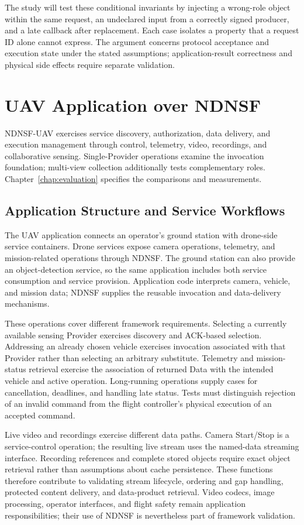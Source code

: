 The study will test these conditional invariants by injecting a wrong-role object within the same request, an undeclared input from a correctly signed producer, and a late callback after replacement. Each case isolates a property that a request ID alone cannot express. The argument concerns protocol acceptance and execution state under the stated assumptions; application-result correctness and physical side effects require separate validation.

\chapter{UAV Application over NDNSF}
\label{chap:uav}
\label{chap:applications}
NDNSF-UAV exercises service discovery, authorization, data delivery, and execution management through control, telemetry, video, recordings, and collaborative sensing. Single-Provider operations examine the invocation foundation; multi-view collection additionally tests complementary roles. Chapter~\ref{chap:evaluation} specifies the comparisons and measurements.

\section{Application Structure and Service Workflows}
The UAV application connects an operator's ground station with drone-side service containers. Drone services expose camera operations, telemetry, and mission-related operations through NDNSF. The ground station can also provide an object-detection service, so the same application includes both service consumption and service provision. Application code interprets camera, vehicle, and mission data; NDNSF supplies the reusable invocation and data-delivery mechanisms.

These operations cover different framework requirements. Selecting a currently available sensing Provider exercises discovery and ACK-based selection. Addressing an already chosen vehicle exercises invocation associated with that Provider rather than selecting an arbitrary substitute. Telemetry and mission-status retrieval exercise the association of returned Data with the intended vehicle and active operation. Long-running operations supply cases for cancellation, deadlines, and handling late status. Tests must distinguish rejection of an invalid command from the flight controller's physical execution of an accepted command.

Live video and recordings exercise different data paths. Camera Start/Stop is a service-control operation; the resulting live stream uses the named-data streaming interface. Recording references and complete stored objects require exact object retrieval rather than assumptions about cache persistence. These functions therefore contribute to validating stream lifecycle, ordering and gap handling, protected content delivery, and data-product retrieval. Video codecs, image processing, operator interfaces, and flight safety remain application responsibilities; their use of NDNSF is nevertheless part of framework validation.

